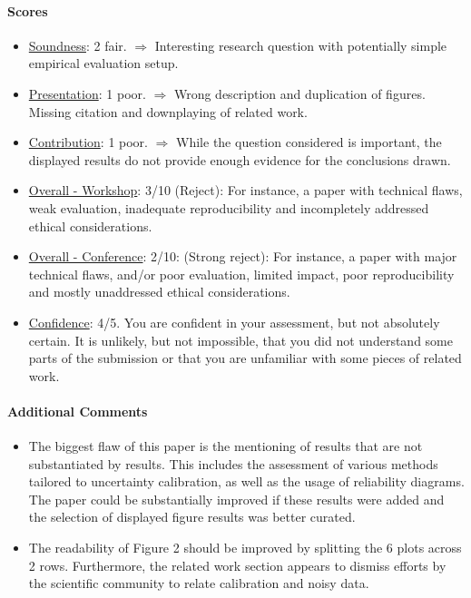 \documentclass[11pt, a4paper]{include/gdm_format}
\begin{document}
\paragraph{Scores}
\begin{itemize}
    \item \underline{Soundness}: 2 fair. $\Rightarrow$ Interesting research question with potentially simple empirical evaluation setup. 
    \item \underline{Presentation}: 1 poor. $\Rightarrow$ Wrong description and duplication of figures. Missing citation and downplaying of related work.
    \item \underline{Contribution}: 1 poor. $\Rightarrow$ While the question considered is important, the displayed results do not provide enough evidence for the conclusions drawn.
    \item \underline{Overall - Workshop}: 3/10 (Reject): For instance, a paper with technical flaws, weak evaluation, inadequate reproducibility and incompletely addressed ethical considerations.
    \item \underline{Overall - Conference}: 2/10: (Strong reject): For instance, a paper with major technical flaws, and/or poor evaluation, limited impact, poor reproducibility and mostly unaddressed ethical considerations.
    \item \underline{Confidence}: 4/5. You are confident in your assessment, but not absolutely certain. It is unlikely, but not impossible, that you did not understand some parts of the submission or that you are unfamiliar with some pieces of related work.
\end{itemize}


\paragraph{Additional Comments}
\begin{itemize}
    \item The biggest flaw of this paper is the mentioning of results that are not substantiated by results. This includes the assessment of various methods tailored to uncertainty calibration, as well as the usage of reliability diagrams. The paper could be substantially improved if these results were added and the selection of displayed figure results was better curated.
    \item The readability of Figure 2 should be improved by splitting the 6 plots across 2 rows. Furthermore, the related work section appears to dismiss efforts by the scientific community to relate calibration and noisy data.
\end{itemize}
\end{document}
